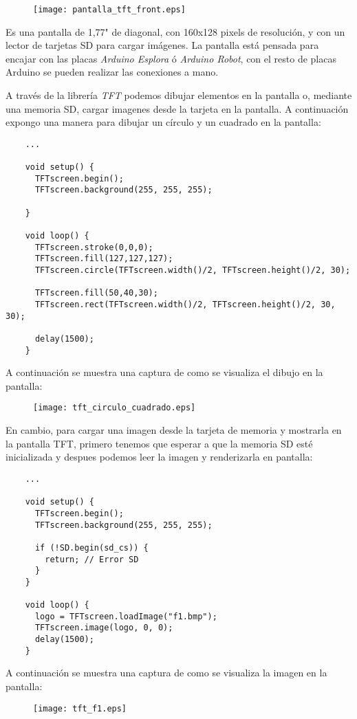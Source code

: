 \begin{figure}[h!]
    \centering
    \texttt{[image: pantalla\_tft\_front.eps]}
    \label{fig:arduino-ide}
\end{figure}



Es una pantalla de 1,77" de diagonal, con 160x128 pixels de resolución, y con un lector de tarjetas SD para cargar imágenes. La pantalla está pensada para encajar con las placas \emph{Arduino Esplora} ó \emph{Arduino Robot}, con el resto de placas Arduino se pueden realizar las conexiones a mano.

A través de la librería \emph{TFT} podemos dibujar elementos en la pantalla o, mediante una memoria SD, cargar imagenes desde la tarjeta en la pantalla. A continuación expongo una manera para dibujar un círculo y un cuadrado en la pantalla:

\begin{lstlisting}
    ...

    void setup() {
      TFTscreen.begin();
      TFTscreen.background(255, 255, 255);

    }

    void loop() {
      TFTscreen.stroke(0,0,0);
      TFTscreen.fill(127,127,127);
      TFTscreen.circle(TFTscreen.width()/2, TFTscreen.height()/2, 30);

      TFTscreen.fill(50,40,30);
      TFTscreen.rect(TFTscreen.width()/2, TFTscreen.height()/2, 30, 30);

      delay(1500);
    }
\end{lstlisting}

A continuación se muestra una captura de como se visualiza el dibujo en la pantalla:

\begin{figure}[h!]
    \centering
    \texttt{[image: tft\_circulo\_cuadrado.eps]}
    \label{fig:arduino-ide}
\end{figure}

En cambio, para cargar una imagen desde la tarjeta de memoria y mostrarla en la pantalla TFT, primero tenemos que esperar a que la memoria SD esté inicializada y despues podemos leer la imagen y renderizarla en pantalla:

\begin{lstlisting}
    ...

    void setup() {
      TFTscreen.begin();
      TFTscreen.background(255, 255, 255);

      if (!SD.begin(sd_cs)) {
        return; // Error SD
      }
    }

    void loop() {
      logo = TFTscreen.loadImage("f1.bmp");
      TFTscreen.image(logo, 0, 0);
      delay(1500);
    }
\end{lstlisting}

A continuación se muestra una captura de como se visualiza la imagen en la pantalla:

\begin{figure}[h!]
    \centering
    \texttt{[image: tft\_f1.eps]}
    \label{fig:arduino-ide}
\end{figure}